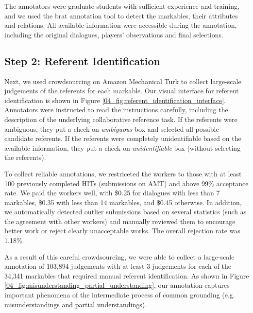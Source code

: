 The annotators were graduate students with sufficient experience and training, and we used the brat annotation tool \citep{stenetorp2012brat} to detect the markables, their attributes and relations. All available information were accessible during the annotation, including the original dialogues, players' observations and final selections.

\subsection{Step 2: Referent Identification}
\label{04_subsec:referent_identification}

Next, we used crowdsourcing on Amazon Mechanical Turk to collect large-scale judgements of the referents for each markable. Our visual interface for referent identification is shown in Figure \ref{04_fig:referent_identification_interface}. Annotators were instructed to read the instructions carefully, including the description of the underlying collaborative reference task. If the referents were ambiguous, they put a check on \textit{ambiguous} box and selected all possible candidate referents. If the referents were completely unidentifiable based on the available information, they put a check on \textit{unidentifiable} box (without selecting the referents).

To collect reliable annotations, we restriceted the workers to those with at least 100 previously completed HITs (submissions on AMT) and above 99\% acceptance rate. We paid the workers well, with \$0.25 for dialogues with less than 7 markables, \$0.35 with less than 14 markables, and \$0.45 otherwise. In addition, we automatically detected outlier submissions based on several statistics (such as the agreement with other workers) and manually reviewed them to encourage better work or reject clearly unacceptable works. The overall rejection rate was 1.18\%.

As a result of this careful crowdsourcing, we were able to collect a large-scale annotation of 103,894 judgements with at least 3 judgements for each of the 34,341 markables that required manual referent identification. As shown in Figure \ref{04_fig:misunderstanding_partial_understanding}, our annotation captures important phenomena of the intermediate process of common grounding (e.g. misunderstandings and partial understandings).

